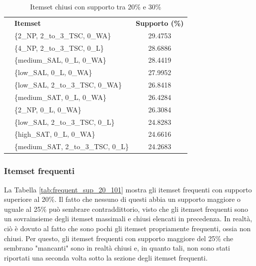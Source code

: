 \documentclass[a4paper]{article}
\newcounter{rowno}
\begin{document}
\begin{table}[h]
\centering
\begingroup
\setlength{\tabcolsep}{5pt} %
\renewcommand{\arraystretch}{1} %
\setcounter{rowno}{0}

\begin{tabularx}{\textwidth}{|>{\stepcounter{rowno}\therowno}c|X|c|}
\hline
\multicolumn{1}{r}{\#} & {\textbf{Itemset}} & {\textbf{Supporto (\%)}} \\

& \{2\_NP, 2\_to\_3\_TSC, 0\_WA\} & 29.4753 \\ 
& \{4\_NP, 2\_to\_3\_TSC, 0\_L\} & 28.6886 \\ 
& \{medium\_SAL, 0\_L, 0\_WA\} & 28.4419 \\ 
& \{low\_SAL, 0\_L, 0\_WA\} & 27.9952 \\ 
& \{low\_SAL, 2\_to\_3\_TSC, 0\_WA\} & 26.8418 \\ 
& \{medium\_SAT, 0\_L, 0\_WA\} & 26.4284 \\ 
& \{2\_NP, 0\_L, 0\_WA\} & 26.3084 \\ 
& \{low\_SAL, 2\_to\_3\_TSC, 0\_L\} & 24.8283 \\ 
& \{high\_SAT, 0\_L, 0\_WA\} & 24.6616 \\ 
& \{medium\_SAT, 2\_to\_3\_TSC, 0\_L\} & 24.2683 \\ 

\hline
\end{tabularx}
\endgroup
\caption{Itemset chiusi con supporto tra 20\% e 30\%}
\label{tab:closed_sup_20_30}
\end{table}



\subsubsection{Itemset frequenti}

La Tabella \ref{tab:frequent_sup_20_101} mostra gli itemset frequenti con supporto superiore al 20\%. Il fatto che nessuno di questi abbia un supporto maggiore o uguale al 25\% può sembrare contraddittorio, visto che gli itemset frequenti sono un sovrainsieme degli itemset massimali e chiusi elencati in precedenza. In realtà, ciò è dovuto al fatto che sono pochi gli itemset propriamente frequenti, ossia non chiusi. Per questo, gli itemset frequenti con supporto maggiore del 25\% che sembrano "mancanti" sono in realtà chiusi e, in quanto tali, non sono stati riportati una seconda volta sotto la sezione degli itemset frequenti.
\end{document}
